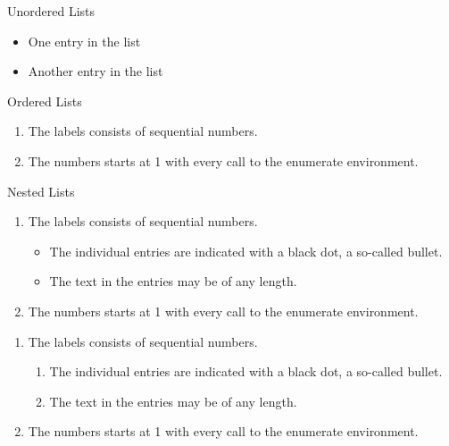 
Unordered Lists
 
\begin{itemize}
  \item One entry in the list
  \item Another entry in the list
\end{itemize}


Ordered Lists
\begin{enumerate}
  \item The labels consists of sequential numbers.
  \item The numbers starts at 1 with every call to the enumerate environment.
\end{enumerate}


Nested Lists

\begin{enumerate}
   \item The labels consists of sequential numbers.
   \begin{itemize}
     \item The individual entries are indicated with a black dot, a so-called bullet.
     \item The text in the entries may be of any length.
   \end{itemize}
   \item The numbers starts at 1 with every call to the enumerate environment.
\end{enumerate}

\begin{enumerate}
   \item The labels consists of sequential numbers.
   \begin{enumerate}
     \item The individual entries are indicated with a black dot, a so-called bullet.
     \item The text in the entries may be of any length.
   \end{enumerate}
   \item The numbers starts at 1 with every call to the enumerate environment.
\end{enumerate}




